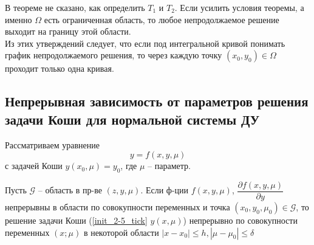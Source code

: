 	\begin{remark}
	    В теореме не сказано, как определить $T_1$ и $T_2$. Если усилить условия теоремы, а именно $\Omega$ есть ограниченная область, то любое непродолжаемое решение выходит на границу этой области.\\
	    Из этих утверждений следует, что если под интегральной кривой понимать график непродолжаемого решения, то через каждую точку $(x_0, y_0) \in \Omega$ проходит только одна кривая.
	\end{remark}
	
    \subsection*{Непрерывная зависимость от параметров решения задачи Коши для нормальной системы ДУ}
        Рассматриваем уравнение
	    \begin{equation}\label{init_2-5_tick}
        y = f(x, y, \mu)
	    \end{equation}
	    с задачей Коши $y(x_0, \mu) = y_0$, где $\mu$ -- параметр.
    \begin{theorem}
		Пусть $\mathcal{G}$ -- область в пр-ве $(z, y, \mu)$. Если ф-ции $f(x, y, \mu)$, $\dfrac{\partial f(x, y, \mu)}{\partial y}$ непрерывны в области по совокупности переменных и точка $(x_0, y_0, \mu_0) \in \mathcal{G}$, то решение задачи Коши (\ref{init_2-5_tick} $y(x, \mu)$) непрерывно по совокупности переменных $(x; \mu)$ в некоторой области $|x - x_0| \leq h, |\mu - \mu_0| \leq \delta$
	\end{theorem}
